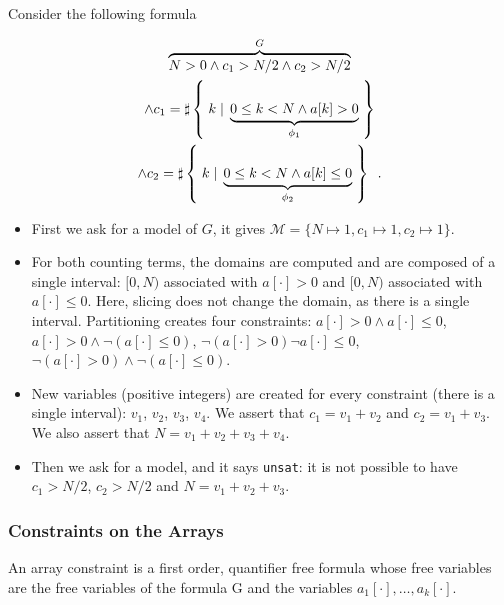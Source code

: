 \newpage

\begin{example}
Consider the following formula

\begin{multline*}
\overbrace{N > 0 \land c_1 > N/2 \land c_2 > N/2}^G \\
\land c_1 = \sharp\left\lbrace\;k\;|\;\underbrace{0 \le k < N \land a[k] > 0}_{\phi_1}\;\right\rbrace \\
\land c_2 = \sharp\left\lbrace\;k\;|\;\underbrace{0 \le k < N \land a[k] \leq 0}_{\phi_2}\;\right\rbrace\enspace.
\end{multline*}

\begin{itemize}
\item First we ask \solver for a model of $G$, it gives $\mathcal{M} = \{ N
\mapsto 1, c_1 \mapsto 1, c_2 \mapsto 1 \}$.
\item For both counting terms, the domains are computed and are composed of a single
interval: $[0, N)$ associated with $a[\cdot] > 0$ and $[0, N)$ associated with
$a[\cdot] \leq 0$. Here, slicing does not change the domain,
as there is a single interval. Partitioning creates four constraints: $a[\cdot] >
0 \land a[\cdot] \leq 0$, $a[\cdot] > 0 \land \lnot (a[\cdot] \leq 0)$,
$\lnot(a[\cdot] > 0) \lnot a[\cdot] \leq 0$, $\lnot (a[\cdot] > 0) \land \lnot
(a[\cdot] \leq 0)$.
\item New variables (positive integers) are created for every constraint (there is a single
interval): $v_1$, $v_2$, $v_3$, $v_4$. We assert
that $c_1 = v_1 + v_2$ and $c_2 = v_1 + v_3$. We also assert that $N = v_1 + v_2
+ v_3 + v_4$.
\item Then we ask \solver for a model, and it says \texttt{unsat}: it is not
possible to have $c_1 > N/2$, $c_2 > N/2$ and $N = v_1 + v_2 + v_3$.
\end{itemize}

\end{example}

\subsubsection{Constraints on the Arrays}

\begin{definition}

An array constraint is a first order, quantifier free formula whose
free variables are the free variables of the formula G and the variables
$a_1[\cdot], \ldots, a_k[\cdot]$.

\label{array}

\end{definition}


